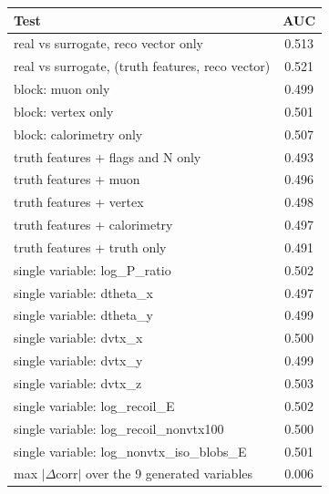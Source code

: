 \begin{tabular}{lc}
\toprule
Test & AUC \\
\midrule
real vs surrogate, reco vector only & 0.513 \\
real vs surrogate, (truth features, reco vector) & 0.521 \\
\midrule
block: muon only & 0.499 \\
block: vertex only & 0.501 \\
block: calorimetry only & 0.507 \\
truth features + flags and N only & 0.493 \\
truth features + muon & 0.496 \\
truth features + vertex & 0.498 \\
truth features + calorimetry & 0.497 \\
truth features + truth only & 0.491 \\
single variable: log\_P\_ratio & 0.502 \\
single variable: dtheta\_x & 0.497 \\
single variable: dtheta\_y & 0.499 \\
single variable: dvtx\_x & 0.500 \\
single variable: dvtx\_y & 0.499 \\
single variable: dvtx\_z & 0.503 \\
single variable: log\_recoil\_E & 0.502 \\
single variable: log\_recoil\_nonvtx100 & 0.500 \\
single variable: log\_nonvtx\_iso\_blobs\_E & 0.501 \\
\midrule
max $|\Delta$corr$|$ over the 9 generated variables & 0.006 \\
\bottomrule
\end{tabular}
